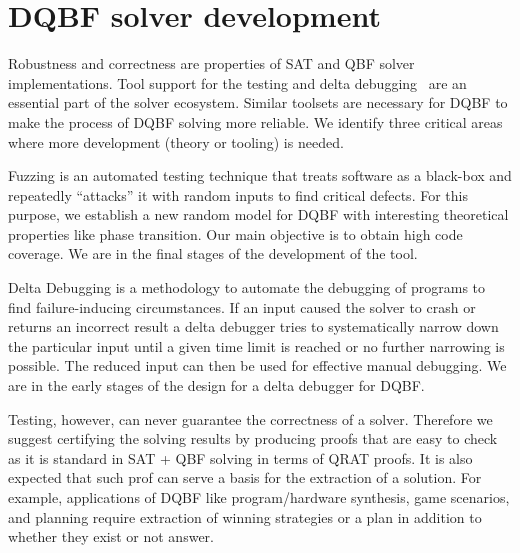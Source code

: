 \documentclass[conference]{IEEEtran}
\begin{document}

\section{DQBF solver development}
\label{sec:dev}

Robustness and correctness are properties of SAT and
QBF solver implementations.
%
Tool support for the testing and delta debugging~\cite{brummayer2010automated} are an essential part of the solver ecosystem.
%
Similar toolsets are necessary for DQBF to make the process of DQBF solving more reliable.  
We identify three critical areas where more development (theory or tooling) is needed.

Fuzzing is an automated testing technique that treats software as a black-box and repeatedly “attacks” it with random inputs to find critical defects.
%
For this purpose, we establish a new random model for DQBF with interesting theoretical properties like phase transition.
%
Our main objective is to obtain high code coverage.
%
We are in the final stages of the development of the tool. 

Delta Debugging is a methodology to automate the debugging of programs to find failure-inducing circumstances. 
%
If an input caused the solver to crash or returns an incorrect result a delta debugger tries to systematically narrow down the particular input until a given time limit is reached or no further narrowing is possible.
%
The reduced input can then be used for effective manual debugging.
%
We are in the early stages of the design for a delta debugger for DQBF.

Testing, however, can never guarantee the correctness of a solver.
%
Therefore we suggest certifying the solving results by producing proofs that are easy to check as it is standard in SAT + QBF solving in terms of QRAT proofs.
%
It is also expected that such prof can serve a basis for the extraction of a solution. 
% 
For example, applications of DQBF like program/hardware synthesis, game scenarios, and planning require extraction of winning strategies or a plan in addition to whether they exist or not answer.
%
%
\end{document}
